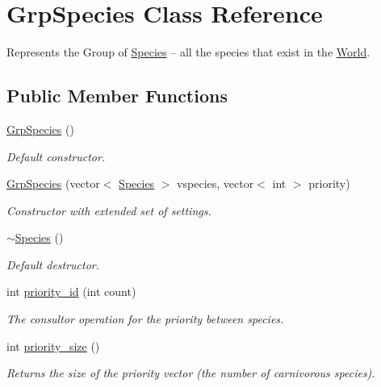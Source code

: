 \hypertarget{class_grp_species}{\section{Grp\-Species Class Reference}
\label{class_grp_species}
}


Represents the Group of \hyperlink{class_species}{Species} – all the species that exist in the \hyperlink{class_world}{World}.  


\subsection*{Public Member Functions}
\begin{DoxyCompactItemize}
\item 
\hyperlink{class_grp_species_aae01eb441932fe90e69af5295f7449d3}{Grp\-Species} ()
\begin{DoxyCompactList}\small\item\em Default constructor. \end{DoxyCompactList}\item 
\hyperlink{class_grp_species_a528284319185c3d9e7dc23bdb6f47f58}{Grp\-Species} (vector$<$ \hyperlink{class_species}{Species} $>$ vspecies, vector$<$ int $>$ priority)
\begin{DoxyCompactList}\small\item\em Constructor with extended set of settings. \end{DoxyCompactList}\item 
\hyperlink{class_grp_species_aefa7f81cd9c5040080661a0aebbe94dd}{$\sim$\-Species} ()
\begin{DoxyCompactList}\small\item\em Default destructor. \end{DoxyCompactList}\item 
int \hyperlink{class_grp_species_ab7ed452e9d482a8f0a623ba0a4597fd1}{priority\-\_\-id} (int count)
\begin{DoxyCompactList}\small\item\em The consultor operation for the priority between species. \end{DoxyCompactList}\item 
int \hyperlink{class_grp_species_a6f8dd5cc59ac2647dead252ee64c8bd3}{priority\-\_\-size} ()
\begin{DoxyCompactList}\small\item\em Returns the size of the priority vector (the number of carnivorous species). \end{DoxyCompactList}\item 

\end{DoxyCompactItemize}
